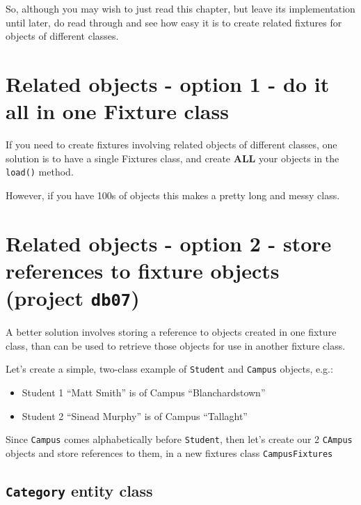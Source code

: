 \documentclass[a4paperpaper,openright]{book}
\providecommand{\tightlist}{%
  \setlength{\itemsep}{0pt}\setlength{\parskip}{0pt}}
\begin{document}
So, although you may wish to just read this chapter, but leave its
implementation until later, do read through and see how easy it is to
create related fixtures for objects of different classes.

\hypertarget{related-objects---option-1---do-it-all-in-one-fixture-class}{%
\section{Related objects - option 1 - do it all in one Fixture
class}\label{related-objects---option-1---do-it-all-in-one-fixture-class}}

If you need to create fixtures involving related objects of different
classes, one solution is to have a single Fixtures class, and create
\textbf{ALL} your objects in the \texttt{load()} method.

However, if you have 100s of objects this makes a pretty long and messy
class.

\hypertarget{related-objects---option-2---store-references-to-fixture-objects-project-db07}{%
\section{\texorpdfstring{Related objects - option 2 - store references
to fixture objects (project
\texttt{db07})}{Related objects - option 2 - store references to fixture objects (project db07)}}\label{related-objects---option-2---store-references-to-fixture-objects-project-db07}}

A better solution involves storing a reference to objects created in one
fixture class, than can be used to retrieve those objects for use in
another fixture class.

Let's create a simple, two-class example of \texttt{Student} and
\texttt{Campus} objects, e.g.:

\begin{itemize}
\tightlist
\item
  Student 1 ``Matt Smith'' is of Campus ``Blanchardstown''
\item
  Student 2 ``Sinead Murphy'' is of Campus ``Tallaght''
\end{itemize}

Since \texttt{Campus} comes alphabetically before \texttt{Student}, then
let's create our 2 \texttt{CAmpus} objects and store references to them,
in a new fixtures class \texttt{CampusFixtures}

\hypertarget{category-entity-class}{%
\subsection{\texorpdfstring{\texttt{Category} entity
class}{Category entity class}}\label{category-entity-class}}
\end{document}
